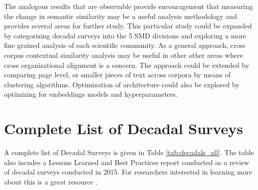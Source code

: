 \documentclass[preprint,12pt]{elsarticle}
\begin{document}
The analogous results that are observable provide encouragement that measuring the change in semantic similarity may be a useful analysis methodology and provides several areas for further study. This particular study could be expanded by categorizing decadal surveys into the 5 SMD divisions and exploring a more fine grained analysis of each scientific community. As a general approach, cross corpus contextual similarity analysis may be useful in other other areas where cross organizational alignment is a concern.  The approach could be extended by comparing page level, or smaller pieces of text across corpora by means of clustering algorithms. Optimization of architecture could also be explored by optimizing for embeddings models and hyperparameters.   


\newpage 
\appendix
\section{Complete List of Decadal Surveys}
\label{app_decadal_surveys}
A complete list of Decadal Surveys is given in Table \ref{tab:decadals_all}. The table also incudes a Lessons Learned and Best Practices report conducted as a review of decadal surveys conducted in 2015. For researchers interested in learning more about this is a great resource \cite{Academies2015_lessons}.
\end{document}
